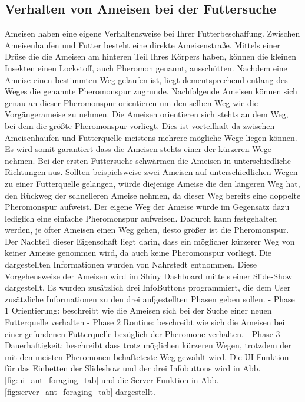 \subsection{Verhalten von Ameisen bei der Futtersuche}\label{chap:VerhaltenAmeisen}
Ameisen haben eine eigene Verhaltensweise bei Ihrer Futterbeschaffung. Zwischen Ameisenhaufen und Futter besteht eine direkte Ameisenstraße. Mittels einer Drüse die die Ameisen am hinteren Teil Ihres Körpers haben, können die kleinen Insekten einen Lockstoff, auch Pheromon genannt, ausschütten. Nachdem eine Ameise einen bestimmten Weg gelaufen ist, liegt dementsprechend entlang des Weges die genannte Pheromonspur zugrunde. Nachfolgende Ameisen können sich genau an dieser Pheromonspur orientieren um den selben Weg wie die Vorgängerameise zu nehmen. Die Ameisen orientieren sich stehts an dem Weg, bei dem die größte Pheromonspur vorliegt. Dies ist vorteilhaft da zwischen Ameisenhaufen und Futterquelle meistens mehrere mögliche Wege liegen können. Es wird somit garantiert dass die Ameisen stehts einer der kürzeren Wege nehmen. Bei der ersten Futtersuche schwärmen die Ameisen in unterschiedliche Richtungen aus. Sollten beispielsweise zwei Ameisen auf unterschiedlichen Wegen zu einer Futterquelle gelangen, würde diejenige Ameise die den längeren Weg hat, den Rückweg der schnelleren Ameise nehmen, da dieser Weg bereits eine doppelte Pheromonspur aufweist. Der eigene Weg der Ameise  würde im Gegensatz dazu lediglich eine einfache Pheromonspur aufweisen. Dadurch kann festgehalten werden, je öfter Ameisen einen Weg gehen, desto größer ist die Pheromonspur. Der Nachteil dieser Eigenschaft liegt darin, dass ein möglicher kürzerer Weg von keiner Ameise genommen wird, da auch keine Pheromonspur vorliegt. Die dargestellten Informationen wurden von Nahrstedt \citep[S.213-214]{Nahrstedt.2018} entnommen.\newline
Diese Vorgehensweise der Ameisen wird im Shiny Dashboard mittels einer Slide-Show dargestellt. Es wurden zusätzlich drei InfoButtons programmiert, die dem User zusätzliche Informationen zu den drei aufgestellten Phasen geben sollen.
\newline
- Phase 1 Orientierung: beschreibt wie die Ameisen sich bei der Suche einer neuen Futterquelle verhalten
\newline
- Phase 2 Routine: beschreibt wie sich die Ameisen bei einer gefundenen Futterquelle bezüglich der Pheromone verhalten.
\newline
- Phase 3 Dauerhaftigkeit: beschreibt dass trotz möglichen kürzeren Wegen, trotzdem der mit den meisten Pheromonen behafteteste Weg gewählt wird.
\newline
Die UI Funktion für das Einbetten der Slideshow und der drei Infobuttons wird in Abb. \ref{fig:ui_ant_foraging_tab} und die Server Funktion in Abb. \ref{fig:server_ant_foraging_tab} dargestellt.

